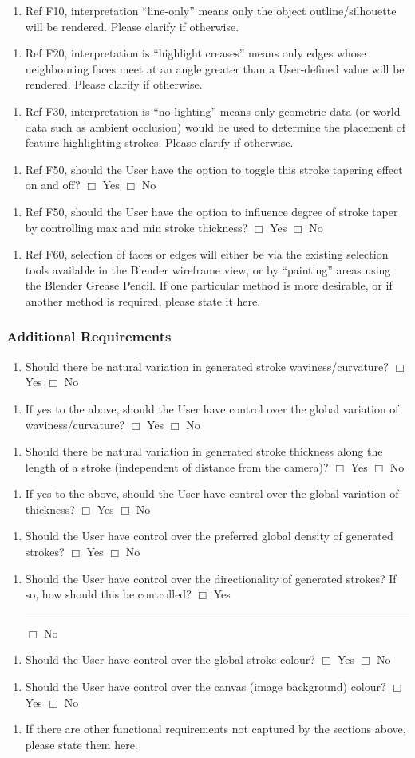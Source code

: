 \documentclass[a4paper,10pt]{article}
\newcommand{\Qq}[1]{#1}
\newcommand{\QO}{$\Box$}%
\newcommand{\Qline}[1]{\noindent\rule{#1}{0.6pt}}
\newcounter{ql}
\newcommand{\Qlines}[1]{\forloop{ql}{0}{\value{ql}<#1}{\vskip0em\Qline{\linewidth}}}
\newcommand{\Qitemf}[2][]{
\begin{enumerate}[topsep=2pt,leftmargin=2.8em]
\item[\textit{F\arabic{fReqNum}#1.}] #2
\addtocounter{fReqNum}{10}
\end{enumerate}
}
\newcommand{\Qitemclar}[2][]{
\begin{enumerate}[topsep=2pt,leftmargin=2.8em]
\item[\textit{C\arabic{clarNum}#1.}] #2
\addtocounter{clarNum}{10}
\end{enumerate}
}
\begin{document}
\Qitemclar{\Qq{Ref F10, interpretation ``line-only'' means only the object outline/silhouette will be rendered. Please clarify if otherwise.} \Qlines{2}}
\Qitemclar{\Qq{Ref F20, interpretation is ``highlight creases'' means only edges whose neighbouring faces meet at an angle greater than a User-defined value will be rendered. Please clarify if otherwise.} \Qlines{2}}
\Qitemclar{\Qq{Ref F30, interpretation is ``no lighting'' means only geometric data (or world data such as ambient occlusion) would be used to determine the placement of feature-highlighting strokes. Please clarify if otherwise.} \Qlines{2}}
\Qitemclar{\Qq{Ref F50, should the User have the option to toggle this stroke tapering effect on and off?}  \newline \QO{} Yes \hskip0.5cm \QO{} No}
\Qitemclar{\Qq{Ref F50, should the User have the option to influence degree of stroke taper by controlling max and min stroke thickness?} \newline \QO{} Yes \hskip0.5cm \QO{} No}
\Qitemclar{\Qq{Ref F60, selection of faces or edges will either be via the existing selection tools available in the Blender wireframe view, or by ``painting'' areas using the Blender Grease Pencil. If one particular method is more desirable, or if another method is required, please state it here.} \Qlines{4}}

\subsubsection{Additional Requirements}

\Qitemf{\Qq{Should there be natural variation in generated stroke waviness/curvature?} \newline \QO{} Yes \hskip0.5cm \QO{} No}
\Qitemf{\Qq{If yes to the above, should the User have control over the global variation of waviness/curvature?} \newline \QO{} Yes \hskip0.5cm \QO{} No}
\Qitemf{\Qq{Should there be natural variation in generated stroke thickness along the length of a stroke (independent of distance from the camera)?} \newline \QO{} Yes \hskip0.5cm \QO{} No}
\Qitemf{\Qq{If yes to the above, should the User have control over the global variation of thickness?} \newline \QO{} Yes \hskip0.5cm \QO{} No}
\Qitemf{\Qq{Should the User have control over the preferred global density of generated strokes?} \newline \QO{} Yes \hskip0.5cm \QO{} No}
\Qitemf{\Qq{Should the User have control over the directionality of generated strokes? If so, how should this be controlled?} \newline \QO{} Yes \Qline{8cm} \hskip0.5cm \QO{} No}
\Qitemf{\Qq{Should the User have control over the global stroke colour?} \newline \QO{} Yes \hskip0.5cm \QO{} No}
\Qitemf{\Qq{Should the User have control over the canvas (image background) colour?} \newline \QO{} Yes \hskip0.5cm \QO{} No}
\Qitemf{\Qq{If there are other functional requirements not captured by the sections above, please state them here.} \Qlines{10}}
\end{document}
